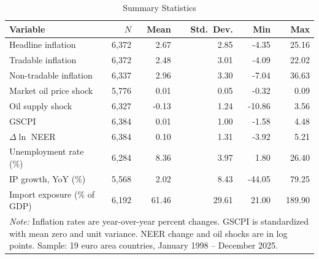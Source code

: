 \begin{table}[htbp]
  \centering
  \caption{Summary Statistics}
  \label{tab:summary}
  \begin{tabular}{lrrrrr}
    \toprule
    Variable & $N$ & Mean & Std.\ Dev. & Min & Max \\
    \midrule
    Headline inflation & 6,372 & 2.67 & 2.85 & -4.35 & 25.16 \\
    Tradable inflation & 6,372 & 2.48 & 3.01 & -4.09 & 22.02 \\
    Non-tradable inflation & 6,337 & 2.96 & 3.30 & -7.04 & 36.63 \\
    Market oil price shock & 5,776 & 0.01 & 0.05 & -0.32 & 0.09 \\
    Oil supply shock & 6,327 & -0.13 & 1.24 & -10.86 & 3.56 \\
    GSCPI & 6,384 & 0.01 & 1.00 & -1.58 & 4.48 \\
    $\Delta \ln$ NEER & 6,384 & 0.10 & 1.31 & -3.92 & 5.21 \\
    Unemployment rate (\%) & 6,284 & 8.36 & 3.97 & 1.80 & 26.40 \\
    IP growth, YoY (\%) & 5,568 & 2.02 & 8.43 & -44.05 & 79.25 \\
    Import exposure (\% of GDP) & 6,192 & 61.46 & 29.61 & 21.00 & 189.90 \\
    \midrule
    \multicolumn{6}{l}{\footnotesize\textit{Note:} Inflation rates are year-over-year percent changes. GSCPI is standardized with mean zero and unit variance. NEER change and oil shocks are in log points. Sample: 19 euro area countries, January 1998 -- December 2025.}
    \bottomrule
  \end{tabular}
\end{table}
